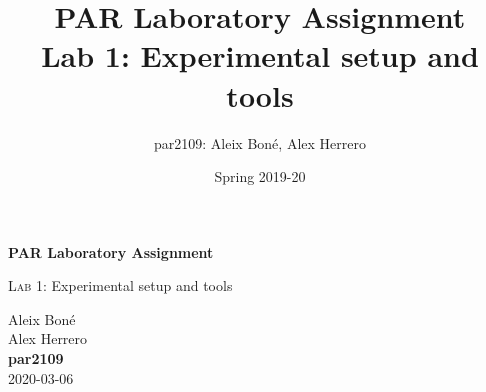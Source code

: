 

\usepackage{caption}
\usepackage{subcaption}
\usepackage{graphicx}

\usepackage{siunitx}

\renewcommand\theadfont{\bfseries}

\title{
    PAR Laboratory Assignment\\
    Lab 1: Experimental setup and tools
}

\author{
    par2109:
    Aleix Boné,
    Alex Herrero
}

\date{
    Spring 2019-20
}



\thispagestyle{empty}
\clearpage
\setcounter{page}{-1}

\begin{titlepage}
{
    \centering
    \null
    \vfill
    {\Huge \bfseries PAR Laboratory Assignment\par}
    \vspace{3em}
    {\Large {\scshape Lab 1:} Experimental setup and tools\par}
    \vfill
\begin{center}
\end{center}
    \vspace{3cm}

    \vfill
    {\raggedleft \Large
        Aleix Boné\\
        Alex Herrero\\
        {\bfseries\ttfamily par2109}\\
        \vspace{4em}
        2020-03-06
        \par}
}
\end{titlepage}

\pagebreak

%


